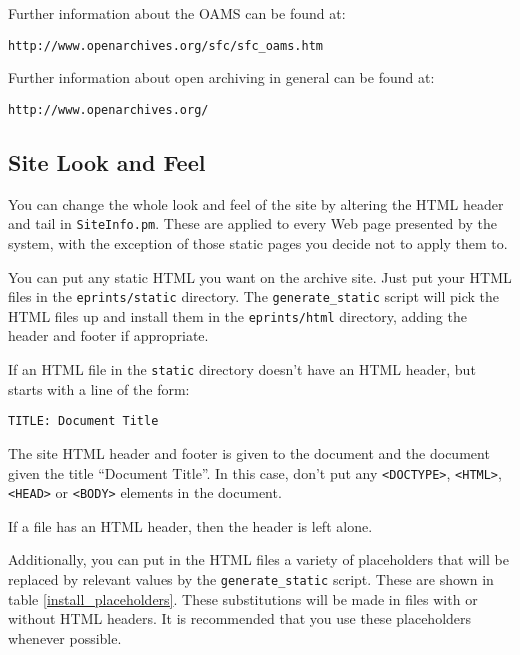 {Further information about the OAMS can be found at:

\begin{verbatim}
http://www.openarchives.org/sfc/sfc_oams.htm
\end{verbatim}

Further information about open archiving in general can be found at:

\begin{verbatim}
http://www.openarchives.org/
\end{verbatim}


\subsection{Site Look and Feel}

You can change the whole look and feel of the site by altering the HTML header and tail in {\tt SiteInfo.pm}. These are applied to every Web page presented by the system, with the exception of those static pages you decide not to apply them to.

You can put any static HTML you want on the archive site. Just put your HTML files in the {\tt eprints/static} directory. The {\tt generate\_static} script will pick the HTML files up and install them in the {\tt eprints/html} directory, adding the header and footer if appropriate.

If an HTML file in the {\tt static} directory doesn't have an HTML header, but starts with a line of the form:

\begin{verbatim}
TITLE: Document Title
\end{verbatim}

The site HTML header and footer is given to the document and the document given the title ``Document Title''. In this case, don't put any {\tt <DOCTYPE>}, {\tt <HTML>}, {\tt <HEAD>} or {\tt <BODY>} elements in the document.

If a file has an HTML header, then the header is left alone.

Additionally, you can put in the HTML files a variety of placeholders that will be replaced by relevant values by the {\tt generate\_static} script. These are shown in table \ref{install_placeholders}. These substitutions will be made in files with or without HTML headers. It is recommended that you use these placeholders whenever possible.

}
